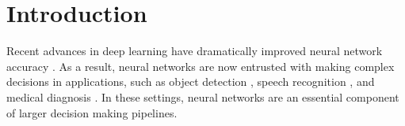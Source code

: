 \section{Introduction}
\label{sec:nn-calibration:introduction}

Recent advances in deep learning have dramatically improved neural network accuracy \citep{simonyan2014very, srivastava2015highway, he2015deep, huang2016deep, huang2016densely}.
As a result, neural networks are now entrusted with making complex decisions in applications, such as object detection \cite{girshick2015fast}, speech recognition \cite{hannun2014deep}, and medical diagnosis \cite{caruana2015intelligible}.
In these settings, neural networks are an essential component of larger decision making pipelines.




